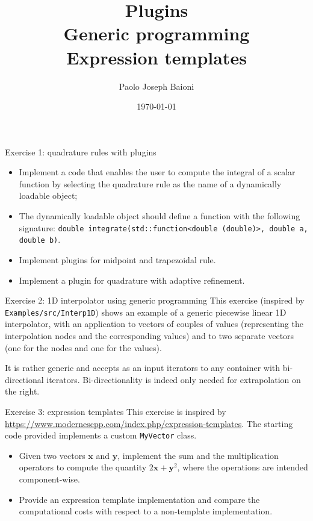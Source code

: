 \documentclass[10pt]{beamer}
\begin{document}
    \title{Plugins \protect\\ Generic programming \protect\\ Expression templates }
    \author{Paolo Joseph Baioni}
    \date{\today}

\begin{frame}
    \maketitle
\end{frame}

\begin{frame}{Exercise 1: quadrature rules with plugins}
\begin{itemize}
\item Implement a code that enables the user to compute the integral of a scalar function by selecting the quadrature rule as the name of a dynamically loadable object;
\item The dynamically loadable object should define a function with the following signature:
\texttt{double integrate(std::function<double (double)>, double a, double b)}.
\item Implement plugins for midpoint and trapezoidal rule.
\item {\color{gray}Implement a plugin for quadrature with adaptive refinement.}
\end{itemize}
\end{frame}


\begin{frame}{Exercise 2: 1D interpolator using generic programming}
This exercise (inspired by \texttt{Examples/src/Interp1D}) shows an example of a generic piecewise linear 1D interpolator, with an application to
vectors of couples of values (representing the interpolation nodes and the corresponding values) and to two separate vectors (one for the nodes and one for the values).

It is rather generic and accepts as an input iterators to any container with bi-directional iterators. Bi-directionality is indeed only needed for extrapolation on the right.
\end{frame}

\begin{frame}{Exercise 3: expression templates}
	This exercise is inspired by \url{https://www.modernescpp.com/index.php/expression-templates}.
	\vfill
	The starting code provided implements a custom \texttt{MyVector} class.
	\begin{itemize}
		\item Given two vectors $\mathbf{x}$ and $\mathbf{y}$, implement the sum and the multiplication operators to compute the quantity $2\mathbf{x} + \mathbf{y}^2$, where the operations are intended component-wise.
		\item Provide an expression template implementation and compare the computational costs with respect to a non-template implementation.
	\end{itemize}
\end{frame}
\end{document}
